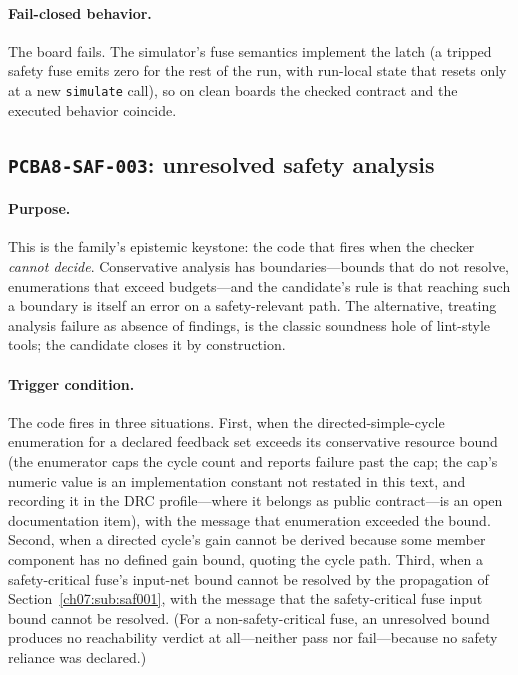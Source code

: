 \paragraph{Fail-closed behavior.} The board fails. The simulator's fuse semantics implement the latch (a tripped safety fuse emits zero for the rest of the run, with run-local state that resets only at a new \texttt{simulate} call), so on clean boards the checked contract and the executed behavior coincide.

\subsection{\texttt{PCBA8-SAF-003}: unresolved safety analysis}\label{ch07:sub:saf003}

\paragraph{Purpose.} This is the family's epistemic keystone: the code that fires when the checker \emph{cannot decide}. Conservative analysis has boundaries---bounds that do not resolve, enumerations that exceed budgets---and the candidate's rule is that reaching such a boundary is itself an error on a safety-relevant path. The alternative, treating analysis failure as absence of findings, is the classic soundness hole of lint-style tools; the candidate closes it by construction.

\paragraph{Trigger condition.} The code fires in three situations. First, when the directed-simple-cycle enumeration for a declared feedback set exceeds its conservative resource bound (the enumerator caps the cycle count and reports failure past the cap; the cap's numeric value is an implementation constant not restated in this text, and recording it in the DRC profile---where it belongs as public contract---is an open documentation item), with the message that enumeration exceeded the bound. Second, when a directed cycle's gain cannot be derived because some member component has no defined gain bound, quoting the cycle path. Third, when a safety-critical fuse's input-net bound cannot be resolved by the propagation of Section~\ref{ch07:sub:saf001}, with the message that the safety-critical fuse input bound cannot be resolved. (For a non-safety-critical fuse, an unresolved bound produces no reachability verdict at all---neither pass nor fail---because no safety reliance was declared.)

